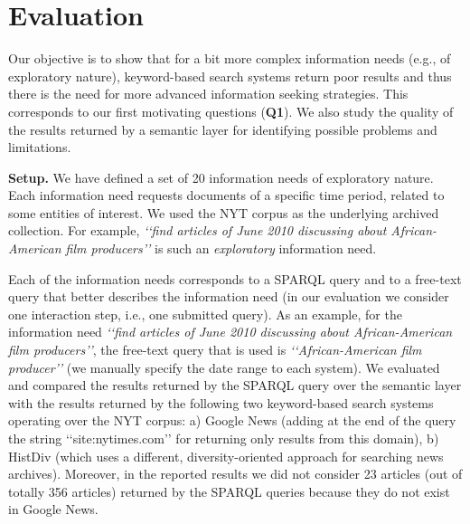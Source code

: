\documentclass{libtex/sig-alternate-05-2015}
\newcommand{\q}[1]{\lq\lq{}{}#1\rq\rq{}{}}
\begin{document}
\section{Evaluation}
\label{sec:eval}

Our objective is to show that
for a bit more complex information needs (e.g., of exploratory nature),
keyword-based search systems return poor results and thus
there is the need for more advanced information seeking strategies.
This corresponds to our first motivating questions ({\bf Q1}).
We also study the quality of the results returned by a semantic layer
for identifying possible problems and limitations.

\vspace{1mm} \noindent
{\bf Setup.}
We have defined a set of 20 information needs of
exploratory nature.
Each information need requests documents
of a specific time period, related to some entities of interest.
We used the NYT corpus as the underlying archived collection.
For example, {\em \q{find articles of June 2010 discussing about African-American film producers}}
is such an {\em exploratory} information need.

Each of the information needs corresponds to a SPARQL query
and to a free-text query that better describes the information need
(in our evaluation we consider one interaction step,
i.e., one submitted query).
As an example, for the information need
{\em \q{find articles of June 2010 discussing about African-American film producers}},
the free-text query that is used is {\em \q{African-American film producer}}
(we manually specify the date range to each system).
We evaluated and compared the results returned by the SPARQL query over the semantic layer
with the results returned by the following two keyword-based search systems operating over the NYT corpus:
a) Google News (adding at the end of the query the string \q{site:nytimes.com} for
returning only results from this domain),
b) HistDiv \cite{singh2016history} (which uses a different, diversity-oriented approach
for searching news archives).
Moreover, in the reported results we did not
consider 23 articles (out of totally 356 articles)
returned by the SPARQL queries because they do not
exist in Google News.
\end{document}
